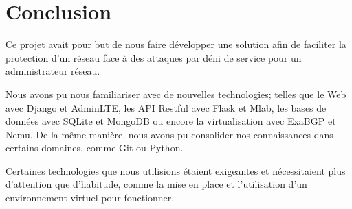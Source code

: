 \chapter*{Conclusion}











Ce projet avait pour but de nous faire développer une solution afin de faciliter la protection d'un réseau face à des attaques par déni de service pour un administrateur réseau.\newline

Nous avons pu nous familiariser avec de nouvelles technologies; telles que le Web avec Django et AdminLTE, les API Restful avec Flask et Mlab, les bases de données avec SQLite et MongoDB ou encore la virtualisation avec ExaBGP et Nemu. De la même manière, nous avons pu consolider nos connaissances dans certains domaines, comme Git ou Python.\newline

Certaines technologies que nous utilisions étaient exigeantes et nécessitaient plus d'attention que d'habitude, comme la mise en place et l'utilisation d'un environnement virtuel pour fonctionner.\newline

